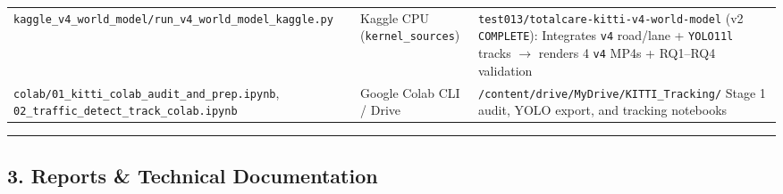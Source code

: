 \documentclass[10.5pt,a4paper]{article}
\begin{document}
\begin{footnotesize}
\begin{longtable}{>{\raggedright\arraybackslash}p{} >{\raggedright\arraybackslash}p{} >{\raggedright\arraybackslash}p{}}
\texttt{kaggle\_\allowbreak{}v4\_\allowbreak{}world\_\allowbreak{}model/\allowbreak{}run\_\allowbreak{}v4\_\allowbreak{}world\_\allowbreak{}model\_\allowbreak{}kaggle.\allowbreak{}py} & Kaggle CPU (\texttt{kernel\_\allowbreak{}sources}) & \texttt{test013/\allowbreak{}totalcare-\allowbreak{}kitti-\allowbreak{}v4-\allowbreak{}world-\allowbreak{}model} (v2 \texttt{COMPLETE}): Integrates \texttt{v4} road/lane + \texttt{YOLO11l} tracks $\rightarrow$ renders 4 \texttt{v4} MP4s + RQ1--RQ4 validation \\
\texttt{colab/\allowbreak{}01\_\allowbreak{}kitti\_\allowbreak{}colab\_\allowbreak{}audit\_\allowbreak{}and\_\allowbreak{}prep.\allowbreak{}ipynb}, \texttt{02\_\allowbreak{}traffic\_\allowbreak{}detect\_\allowbreak{}track\_\allowbreak{}colab.\allowbreak{}ipynb} & Google Colab CLI / Drive & \texttt{/\allowbreak{}content/\allowbreak{}drive/\allowbreak{}MyDrive/\allowbreak{}KITTI\_\allowbreak{}Tracking/\allowbreak{}} Stage 1 audit, YOLO export, and tracking notebooks \\
\end{longtable}
\end{footnotesize}


\par\noindent\rule{\textwidth}{0.4pt}\par\medskip

\subsection{3. Reports \& Technical Documentation}
\end{document}
